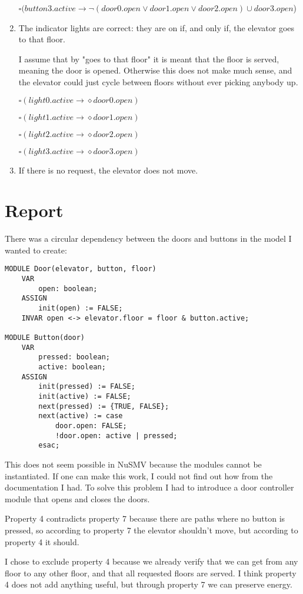 \documentclass[12pt, a4paper]{article}
\begin{document}
\begin{enumerate}
	$\square (button3.active \rightarrow \lnot (door0.open \lor door1.open \lor door 2.open) \cup door3.open$)
	\item %
	The indicator lights are correct: they are on if, and only if, the elevator goes to that floor.

	I assume that by "goes to that floor" it is meant that the floor is served, meaning the door is opened. Otherwise this does not make much sense, and the elevator could just cycle between floors without ever picking anybody up.

	$\square (light0.active \rightarrow \diamond door0.open)$

	$\square (light1.active \rightarrow \diamond door1.open)$

	$\square (light2.active \rightarrow \diamond door2.open)$

	$\square (light3.active \rightarrow \diamond door3.open)$
	\item %
	If there is no request, the elevator does not move.
\end{enumerate}

\section{Report}
There was a circular dependency between the doors and buttons in the model I wanted to create:

\begin{lstlisting}
MODULE Door(elevator, button, floor)
	VAR
		open: boolean;
	ASSIGN
		init(open) := FALSE;
	INVAR open <-> elevator.floor = floor & button.active;

MODULE Button(door)
	VAR
		pressed: boolean;
		active: boolean;
	ASSIGN
		init(pressed) := FALSE;
		init(active) := FALSE;
		next(pressed) := {TRUE, FALSE};
		next(active) := case
			door.open: FALSE;
			!door.open: active | pressed;
		esac;
\end{lstlisting}

This does not seem possible in NuSMV because the modules cannot be instantiated. If one can make this work, I could not find out how from the documentation I had. To solve this problem I had to introduce a door controller module that opens and closes the doors.

Property 4 contradicts property 7 because there are paths where no button is pressed, so according to property 7 the elevator shouldn't move, but according to property 4 it should.

I chose to exclude property 4 because we already verify that we can get from any floor to any other floor, and that all requested floors are served. I think property 4 does not add anything useful, but through property 7 we can preserve energy.
\end{document}
